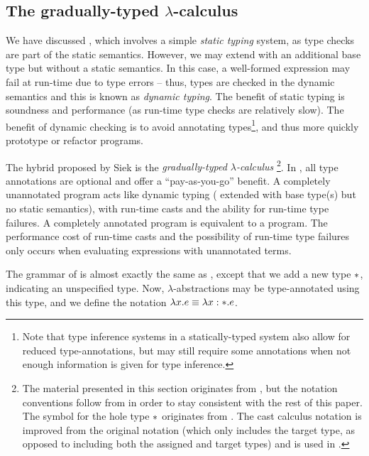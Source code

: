 
\subsection{The gradually-typed $\lambda$-calculus}
\label{sec:gradual}

We have discussed \stlc{}, which involves a simple \textit{static typing} system, as type checks are part of the static semantics. However, we may extend \ulc{} with an additional base type but without a static semantics. In this case, a well-formed expression may fail at run-time due to type errors -- thus, types are checked in the dynamic semantics and this is known as \textit{dynamic typing}. The benefit of static typing is soundness and performance (as run-time type checks are relatively slow). The benefit of dynamic checking is to avoid annotating types\footnote{Note that type inference systems in a statically-typed system also allow for reduced type-annotations, but may still require some annotations when not enough information is given for type inference.}, and thus more quickly prototype or refactor programs.

The hybrid proposed by Siek is the \textit{gradually-typed $\lambda$-calculus} \gtlc{} \cite{Siek06gradualtyping,siek2015refined}\footnote{The material presented in this section originates from \cite{Siek06gradualtyping,siek2015refined}, but the notation conventions follow from \cite{conf/popl/HazelnutLive19} in order to stay consistent with the rest of this paper. The symbol for the hole type $*{}$ originates from \cite{siek2015refined}. The cast calculus notation is improved from the original notation (which only includes the target type, as opposed to including both the assigned and target types) and is used in \cite{siek2015refined,conf/popl/HazelnutLive19}.}. In \gtlc{}, all type annotations are optional and offer a ``pay-as-you-go'' benefit. A completely unannotated \gtlc{} program acts like dynamic typing (\ulc{} extended with base type(s) but no static semantics), with run-time casts and the ability for run-time type failures. A completely annotated \gtlc{} program is equivalent to a \stlc{} program. The performance cost of run-time casts and the possibility of run-time type failures only occurs when evaluating expressions with unannotated terms.

The grammar of \gtlc{} is almost exactly the same as \stlc, except that we add a new type $*$, indicating an unspecified type. Now, $\lambda$-abstractions may be type-annotated using this type, and we define the notation $\lambda x.e\equiv\lambda x:*.e$.

